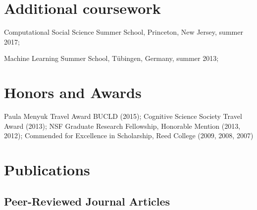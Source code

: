 \documentclass[letterpaper]{article}
\renewenvironment{itemize}{
  \begin{list}{}{
    \setlength{\leftmargin}{1.5em}
  }
}{
  \end{list}
}
\begin{document}
  \section*{Additional coursework}
  \begin{itemize}
     \item  Computational Social Science Summer School, Princeton, New Jersey, summer 2017;     \item Machine Learning Summer School, T\"{u}bingen, Germany, summer 2013; 
\end{itemize}




		

\section*{Honors and Awards}
\begin{itemize}
\item Paula Menyuk Travel Award BUCLD (2015); Cognitive Science Society Travel Award (2013); NSF Graduate Research Fellowship, Honorable Mention (2013, 2012); Commended for Excellence in Scholarship, Reed College (2009, 2008, 2007)
\end{itemize}



\section*{Publications}

\subsection*{Peer-Reviewed Journal Articles}
\end{document}
